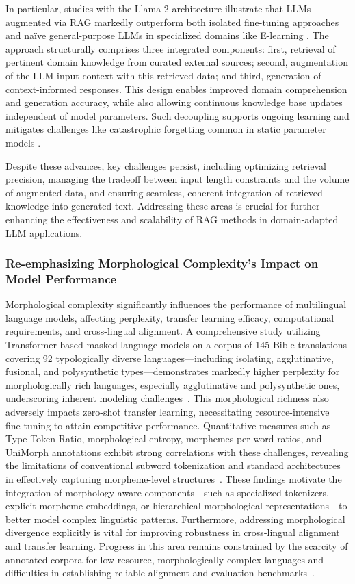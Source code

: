 \documentclass[sigconf]{acmart}
\begin{document}
In particular, studies with the Llama 2 architecture illustrate that LLMs augmented via RAG markedly outperform both isolated fine-tuning approaches and naïve general-purpose LLMs in specialized domains like E-learning \cite{ref49}. The approach structurally comprises three integrated components: first, retrieval of pertinent domain knowledge from curated external sources; second, augmentation of the LLM input context with this retrieved data; and third, generation of context-informed responses. This design enables improved domain comprehension and generation accuracy, while also allowing continuous knowledge base updates independent of model parameters. Such decoupling supports ongoing learning and mitigates challenges like catastrophic forgetting common in static parameter models \cite{ref49}.

Despite these advances, key challenges persist, including optimizing retrieval precision, managing the tradeoff between input length constraints and the volume of augmented data, and ensuring seamless, coherent integration of retrieved knowledge into generated text. Addressing these areas is crucial for further enhancing the effectiveness and scalability of RAG methods in domain-adapted LLM applications.

\subsubsection{Re-emphasizing Morphological Complexity’s Impact on Model Performance}

Morphological complexity significantly influences the performance of multilingual language models, affecting perplexity, transfer learning efficacy, computational requirements, and cross-lingual alignment. A comprehensive study utilizing Transformer-based masked language models on a corpus of 145 Bible translations covering 92 typologically diverse languages—including isolating, agglutinative, fusional, and polysynthetic types—demonstrates markedly higher perplexity for morphologically rich languages, especially agglutinative and polysynthetic ones, underscoring inherent modeling challenges~\cite{ref34}. This morphological richness also adversely impacts zero-shot transfer learning, necessitating resource-intensive fine-tuning to attain competitive performance. Quantitative measures such as Type-Token Ratio, morphological entropy, morphemes-per-word ratios, and UniMorph annotations exhibit strong correlations with these challenges, revealing the limitations of conventional subword tokenization and standard architectures in effectively capturing morpheme-level structures~\cite{ref34}. These findings motivate the integration of morphology-aware components—such as specialized tokenizers, explicit morpheme embeddings, or hierarchical morphological representations—to better model complex linguistic patterns. Furthermore, addressing morphological divergence explicitly is vital for improving robustness in cross-lingual alignment and transfer learning. Progress in this area remains constrained by the scarcity of annotated corpora for low-resource, morphologically complex languages and difficulties in establishing reliable alignment and evaluation benchmarks~\cite{ref34}.
\end{document}
